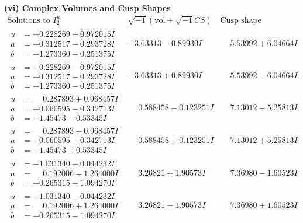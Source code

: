 \documentclass[1p]{elsarticle_modified}
\theoremstyle{definition}
\newcommand{\I}{\sqrt{-1}}
\begin{document}
\newpage\flushleft \textbf{(vi) Complex Volumes and Cusp Shapes}
$$\begin{array}{c|c|c}  
\text{Solutions to }I^u_{2}& \I (\text{vol} + \sqrt{-1}CS) & \text{Cusp shape}\\
 \hline 
\begin{aligned}
u &= -0.228269 + 0.972015 I \\
a &= -0.312517 + 0.293728 I \\
b &= -1.273360 + 0.251375 I\end{aligned}
 & -3.63313 - 0.89930 I & \phantom{-}5.53992 + 6.04664 I \\ \hline\begin{aligned}
u &= -0.228269 - 0.972015 I \\
a &= -0.312517 - 0.293728 I \\
b &= -1.273360 - 0.251375 I\end{aligned}
 & -3.63313 + 0.89930 I & \phantom{-}5.53992 - 6.04664 I \\ \hline\begin{aligned}
u &= \phantom{-}0.287893 + 0.968457 I \\
a &= -0.060595 - 0.342713 I \\
b &= -1.45473 - 0.53345 I\end{aligned}
 & \phantom{-}0.588458 - 0.123251 I & \phantom{-}7.13012 - 5.25813 I \\ \hline\begin{aligned}
u &= \phantom{-}0.287893 - 0.968457 I \\
a &= -0.060595 + 0.342713 I \\
b &= -1.45473 + 0.53345 I\end{aligned}
 & \phantom{-}0.588458 + 0.123251 I & \phantom{-}7.13012 + 5.25813 I \\ \hline\begin{aligned}
u &= -1.031340 + 0.044232 I \\
a &= \phantom{-}0.192006 - 1.264000 I \\
b &= -0.265315 + 1.094270 I\end{aligned}
 & \phantom{-}3.26821 + 1.90573 I & \phantom{-}7.36980 - 1.60523 I \\ \hline\begin{aligned}
u &= -1.031340 - 0.044232 I \\
a &= \phantom{-}0.192006 + 1.264000 I \\
b &= -0.265315 - 1.094270 I\end{aligned}
 & \phantom{-}3.26821 - 1.90573 I & \phantom{-}7.36980 + 1.60523 I \\ \hline\begin{aligned}

\end{aligned}
\end{array}$$
\end{document}

